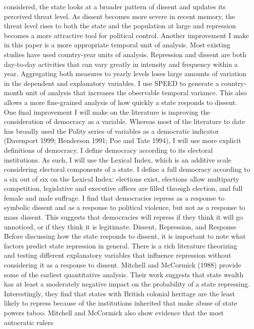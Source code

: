 \documentclass[ignorenonframetext,]{beamer}
\begin{document}
\begin{frame}[fragile]
considered, the state looks at a broader pattern of dissent and updates
its perceived threat level. As dissent becomes more severe in recent
memory, the threat level rises to both the state and the population at
large and repression becomes a more attractive tool for political
control. Another improvement I make in this paper is a more appropriate
temporal unit of analysis. Most existing studies have used country-year
units of analysis. Repression and dissent are both day-to-day activities
that can vary greatly in intensity and frequency within a year.
Aggregating both measures to yearly levels loses large amounts of
variation in the dependent and explanatory variables. I use SPEED to
generate a country-month unit of analysis that increases the observable
temporal variance. This also allows a more fine-grained analysis of how
quickly a state responds to dissent. One final improvement I will make
on the literature is improving the consideration of democracy as a
variable. Whereas most of the literature to date has broadly used the
Polity series of variables as a democratic indicator (Davenport 1999;
Henderson 1991; Poe and Tate 1994), I will use more explicit definitions
of democracy. I define democracy according to its electoral
institutions. As such, I will use the Lexical Index, which is an
additive scale considering electoral components of a state. I define a
full democracy according to a six out of six on the Lexical Index:
elections exist, elections allow multiparty competition, legislative and
executive offices are filled through election, and full female and male
suffrage. I find that democracies repress as a response to symbolic
dissent and as a response to political violence, but not as a response
to mass dissent. This suggests that democracies will repress if they
think it will go unnoticed, or if they think it is legitimate. Dissent,
Repression, and Response Before discussing how the state responds to
dissent, it is important to note what factors predict state repression
in general. There is a rich literature theorizing and testing different
explanatory variables that influence repression without considering it
as a response to dissent. Mitchell and McCormick (1988) provide some of
the earliest quantitative analysis. Their work suggests that state
wealth has at least a moderately negative impact on the probability of a
state repressing. Interestingly, they find that states with British
colonial heritage are the least likely to repress because of the
institutions inherited that make abuse of state powers taboo. Mitchell
and McCormick also show evidence that the most autocratic rulers

\end{frame}
\end{document}
